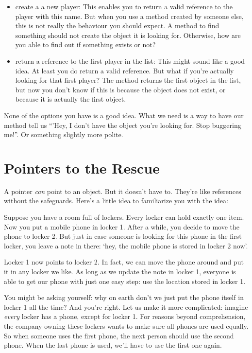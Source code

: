 \begin{itemize}
  \item create a a new player: This enables you to return a valid reference to the player with this name. But when you use a method created by someone else, this is not really the behaviour you should expect. A method to find something should not create the object it is looking for. Otherwise, how are you able to find out if something exists or not?
  \item return a reference to the first player in the list: This might sound like a good idea. At least you do return a valid reference. But what if you're actually looking for that first player? The method returns the first object in the list, but now you don't know if this is because the object does not exist, or because it is actually the first object.
\end{itemize}

None of the options you have is a good idea. What we need is a way to have our method tell us ``'Hey, I don't have the object you're looking for. Stop buggering me!''. Or something slightly more polite.

\section{Pointers to the Rescue}

A pointer \textsl{can} point to an object. But it doesn't have to. They're like references without the safeguards. Here's a little idea to familiarize you with the idea:

Suppose you have a room full of lockers. Every locker can hold exactly one item. Now you put a mobile phone in locker 1. After a while, you decide to move the phone to locker 2. But just in case someone is looking for this phone in the first locker, you leave a note in there: `hey, the mobile phone is stored in locker 2 now'.

Locker 1 now points to locker 2. In fact, we can move the phone around and put it in any locker we like. As long as we update the note in locker 1, everyone is able to get our phone with just one easy step: use the location stored in locker 1.

You might be asking yourself: why on earth don't we just put the phone itself in locker 1 all the time? And you're right. Let us make it more complicated: imagine \textsl{every} locker has a phone, except for locker 1. For reasons beyond comprehension, the company owning these lockers wants to make sure all phones are used equally. So when someone uses the first phone, the next person should use the second phone. When the last phone is used, we'll have to use the first one again.

